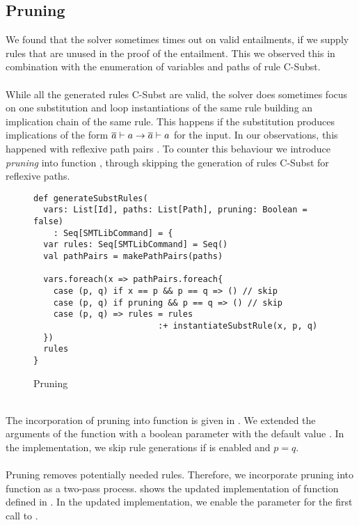 \subsection{Pruning}
We found that the solver sometimes times out
on valid entailments, if we supply rules
that are unused in the proof of the entailment.
This we observed this in combination
with the enumeration of variables and paths of rule C-Subst.\\
\\
While all the generated rules C-Subst are valid,
the solver does sometimes focus on one substitution
and loop instantiations of the same rule
building an implication chain of the same rule.
This happens if the substitution produces implications
of the form $\overline{a} \vdash a \rightarrow \overline{a} \vdash a$
for the input.
In our observations, this happened with reflexive path pairs .
To counter this behaviour we introduce \textit{pruning} into function ,
through skipping the generation of rules C-Subst for reflexive paths.
%
\begin{figure}[h]
\begin{lstlisting}
def generateSubstRules(
  vars: List[Id], paths: List[Path], pruning: Boolean = false)
    : Seq[SMTLibCommand] = {
  var rules: Seq[SMTLibCommand] = Seq()
  val pathPairs = makePathPairs(paths)

  vars.foreach(x => pathPairs.foreach{
    case (p, q) if x == p && p == q => () // skip
    case (p, q) if pruning && p == q => () // skip
    case (p, q) => rules = rules
                         :+ instantiateSubstRule(x, p, q)
  })
  rules
}
\end{lstlisting}
\caption{Pruning}
\label{fig:scala-pruning}
\end{figure}\\
The incorporation of pruning into function 
is given in .
We extended the arguments of the function with a
boolean parameter  with the default value .
In the implementation, we skip rule generations
if  is enabled and $p = q$.\\
\\
Pruning removes potentially needed rules.
Therefore, we incorporate pruning into function
 as a two-pass process.
 shows the updated
implementation of function  defined in .
In the updated implementation, we enable the  parameter
for the first call to .
